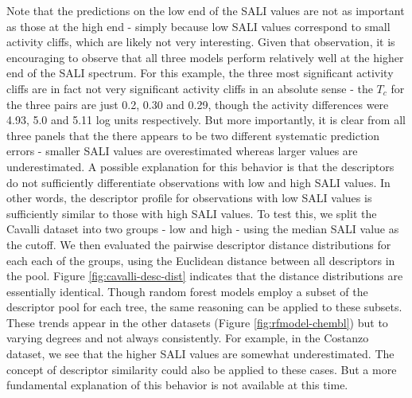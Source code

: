 \documentclass[letterpaper, 12pt]{article}
\begin{document}
Note that the predictions on the low end of the SALI values are not as important as those at the
high end - simply because low SALI values correspond to small activity cliffs, which are likely not
very interesting. Given that observation, it is encouraging to observe that all three models perform
relatively well at the higher end of the SALI spectrum. For this example, the three most significant
activity cliffs are in fact not very significant activity cliffs in an absolute sense - the $T_c$
for the three pairs are just 0.2, 0.30 and 0.29, though the activity differences were 4.93, 5.0 and
5.11 log units respectively.  But more importantly, it is clear from all three panels that the there
appears to be two different systematic prediction errors - smaller SALI values are overestimated
whereas larger values are underestimated.  A possible explanation for this behavior is that the
descriptors do not sufficiently differentiate observations with low and high SALI values. In other
words, the descriptor profile for observations with low SALI values is sufficiently similar to those
with high SALI values. To test this, we split the Cavalli dataset into two groups - low and high
- using the median SALI value as the cutoff. We then evaluated the pairwise descriptor distance
distributions for each each of the groups, using the Euclidean distance between all descriptors in
the pool. Figure \ref{fig:cavalli-desc-dist} indicates that the distance distributions are
essentially identical. Though random forest models employ a subset of the descriptor pool for each
tree, the same reasoning can be applied to these subsets. These trends appear in the other datasets
(Figure \ref{fig:rfmodel-chembl}) but to varying degrees and not always consistently. For example,
in the Costanzo dataset, we see that the higher SALI values are somewhat underestimated. The concept
of descriptor similarity could also be applied to these cases. But a more fundamental explanation of
this behavior is not available at this time.
\end{document}
